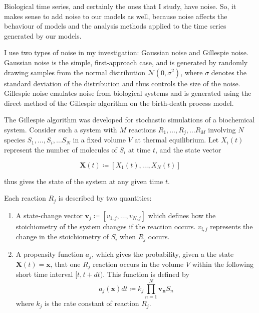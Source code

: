 Biological time series, and certainly the ones that I study, have noise.
So, it makes sense to add noise to our models as well, because noise affects the behaviour of models and the analysis methods applied to the time series generated by our models.

I use two types of noise in my investigation: Gaussian noise and Gillespie noise.
Gaussian noise is the simple, first-approach case, and is generated by randomly drawing samples from the normal distribution $\mathcal{N}(0,\sigma^{2})$, where $\sigma$ denotes the standard deviation of the distribution and thus controls the size of the noise.
Gillespie noise emulates noise from biological systems and is generated using the direct method of the Gillespie algorithm \parencite{gillespieExactStochasticSimulation1977} on the birth-death process model.

The Gillespie algorithm was developed for stochastic simulations of a biochemical system.
Consider such a system with $M$ reactions $R_{1}, \ldots , R_{j}, \ldots R_{M}$ involving $N$ species $S_{1}, \ldots , S_{i}, \ldots S_{N}$ in a fixed volume $V$ at thermal equilibrium.
Let $X_{i}(t)$ represent the number of molecules of $S_{i}$ at time $t$, and the state vector

\begin{equation}
  \mathbf{X}(t) \coloneqq [X_{1}(t), \ldots , X_{N}(t)]
  \label{eq:gillespie-statevector}
\end{equation}

thus gives the state of the system at any given time $t$.

Each reaction $R_{j}$ is described by two quantities:
\begin{enumerate}
  \item A state-change vector $\mathbf{v}_{j} \coloneqq [v_{1,j}, \ldots , v_{N,j}]$ which defines how the stoichiometry of the system changes if the reaction occurs.
        $v_{i,j}$ represents the change in the stoichiometry of $S_{i}$ when $R_{j}$ occurs.
  \item A propensity function $a_{j}$, which gives the probability, given a the state $\mathbf{X}(t) = \mathbf{x}$, that one $R_{j}$ reaction occurs in the volume $V$ within the following short time interval $[t, t+dt)$.
        This function is defined by
        \begin{equation}
          a_{j}(\mathbf{x})dt \coloneqq k_{j} \prod_{n=1}^{N}\mathbf{v_{n}}S_{n}
          \label{eq:gillespie-propensity}
        \end{equation}
        where $k_{j}$ is the rate constant of reaction $R_{j}$.
\end{enumerate}

